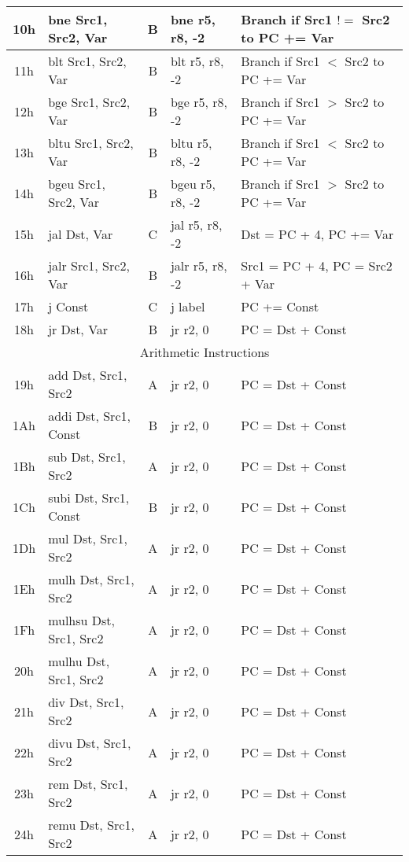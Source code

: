 \documentclass[]{article}
\begin{document}
\begin{longtable}{|c|l|c|l|l|}
	\hline
	10h & bne Src1, Src2, Var & B & bne r5, r8, -2 & Branch if Src1 $!=$ Src2 to PC += Var \\
	\hline
	11h & blt Src1, Src2, Var & B & blt r5, r8, -2 & Branch if Src1 $<$ Src2 to PC += Var \\
	\hline
	12h & bge Src1, Src2, Var & B & bge r5, r8, -2 & Branch if Src1 $>$ Src2 to PC += Var \\
	\hline
	13h & bltu Src1, Src2, Var & B & bltu r5, r8, -2 & Branch if Src1 $<$ Src2 to PC += Var \\
	\hline
	14h & bgeu Src1, Src2, Var & B & bgeu r5, r8, -2 & Branch if Src1 $>$ Src2 to PC += Var \\
	\hline
	15h & jal Dst, Var & C & jal r5, r8, -2 & Dst = PC + 4, PC += Var \\
	\hline
	16h & jalr Src1, Src2, Var & B & jalr r5, r8, -2 & Src1 = PC + 4, PC = Src2 + Var \\
	\hline
	17h & j Const & C & j label & PC += Const \\
	\hline
	18h & jr Dst, Var & B & jr r2, 0 & PC = Dst + Const \\
	\hline
	\multicolumn{5}{|c|}{Arithmetic Instructions} \\
	\hline
	19h & add Dst, Src1, Src2 & A & jr r2, 0 & PC = Dst + Const \\
	\hline
	1Ah & addi Dst, Src1, Const & B & jr r2, 0 & PC = Dst + Const \\
	\hline
	1Bh & sub Dst, Src1, Src2 & A & jr r2, 0 & PC = Dst + Const \\
	\hline
	1Ch & subi Dst, Src1, Const & B & jr r2, 0 & PC = Dst + Const \\
	\hline
	1Dh & mul Dst, Src1, Src2 & A & jr r2, 0 & PC = Dst + Const \\
	\hline
	1Eh & mulh Dst, Src1, Src2 & A & jr r2, 0 & PC = Dst + Const \\
	\hline
	1Fh & mulhsu Dst, Src1, Src2 & A & jr r2, 0 & PC = Dst + Const \\
	\hline
	20h & mulhu Dst, Src1, Src2 & A & jr r2, 0 & PC = Dst + Const \\
	\hline
	21h & div Dst, Src1, Src2 & A & jr r2, 0 & PC = Dst + Const \\
	\hline
	22h & divu Dst, Src1, Src2 & A & jr r2, 0 & PC = Dst + Const \\
	\hline
	23h & rem Dst, Src1, Src2 & A & jr r2, 0 & PC = Dst + Const \\
	\hline
	24h & remu Dst, Src1, Src2 & A & jr r2, 0 & PC = Dst + Const \\
	\hline

\end{longtable}
\end{document}
